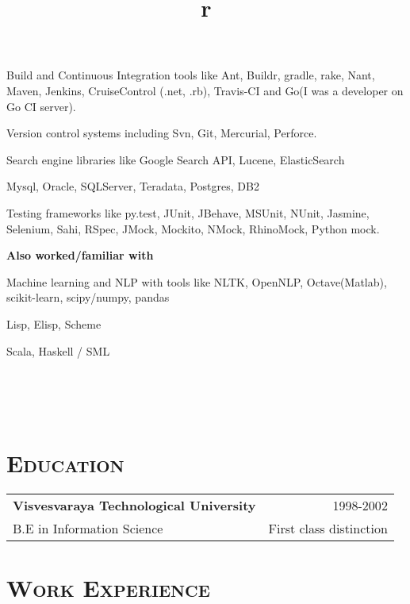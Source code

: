 \begin{resume}
\begin{mylist}
  \item Build and Continuous Integration tools like Ant, Buildr, gradle, rake, Nant, Maven,  Jenkins, CruiseControl (.net, .rb), Travis-CI and Go(I was a developer on Go CI server).
\item Version control systems including Svn, Git, Mercurial, Perforce.
 \item Search engine libraries like Google Search API, Lucene, ElasticSearch
  \item Mysql, Oracle, SQLServer, Teradata, Postgres, DB2
  \item Testing frameworks like py.test, JUnit, JBehave, MSUnit, NUnit, Jasmine, Selenium, Sahi, RSpec, JMock, Mockito, NMock, RhinoMock, Python mock.
\end{mylist}

{\textbf{Also worked/familiar with}}
\begin{mylist}
  \item Machine learning and NLP with tools like NLTK, OpenNLP, Octave(Matlab), scikit-learn, scipy/numpy, pandas
  \item Lisp, Elisp, Scheme
  \item Scala, Haskell / SML
\end{mylist}



\begin{formatb}
  \title{r}\\
  \\
  \body\\
\end{formatb}

\section{\textsc{Education}}

\begin{tabular*}{1\textwidth}{@{\extracolsep{\fill} } l  r }
  \textbf{Visvesvaraya Technological University} & 1998-2002  \\
  B.E in Information Science  & First class distinction  \\
\end{tabular*}


\section{\textsc{Work Experience}}


\end{resume}
